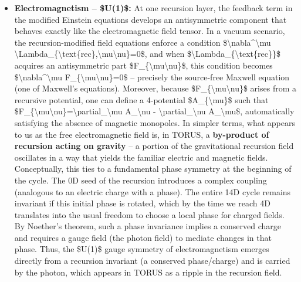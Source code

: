 \documentclass[
]{article}
\begin{document}
\begin{itemize}
\item
  \textbf{Electromagnetism -- \$U(1)\$:} At one recursion layer, the
  feedback term in the modified Einstein equations develops an
  antisymmetric component that behaves exactly like the electromagnetic
  field tensor. In a vacuum scenario, the recursion-modified field
  equations enforce a condition
  \$\textbackslash nabla\^{}\textbackslash mu
  \textbackslash Lambda\_\{\textbackslash text\{rec\},\textbackslash mu\textbackslash nu\}=0\$,
  and when \$\textbackslash Lambda\_\{\textbackslash text\{rec\}\}\$
  acquires an antisymmetric part
  \$F\_\{\textbackslash mu\textbackslash nu\}\$, this condition becomes
  \$\textbackslash nabla\^{}\textbackslash mu
  F\_\{\textbackslash mu\textbackslash nu\}=0\$ -- precisely the
  source-free Maxwell equation (one of Maxwell's equations)\hspace{0pt}.
  Moreover, because \$F\_\{\textbackslash mu\textbackslash nu\}\$ arises
  from a recursive potential, one can define a 4-potential
  \$A\_\{\textbackslash mu\}\$ such that
  \$F\_\{\textbackslash mu\textbackslash nu\}=\textbackslash partial\_\textbackslash mu
  A\_\textbackslash nu - \textbackslash partial\_\textbackslash nu
  A\_\textbackslash mu\$, automatically satisfying the absence of
  magnetic monopoles\hspace{0pt}. In simpler terms, what appears to us
  as the free electromagnetic field is, in TORUS, a \textbf{by-product
  of recursion acting on gravity} -- a portion of the gravitational
  recursion field oscillates in a way that yields the familiar electric
  and magnetic fields\hspace{0pt}. Conceptually, this ties to a
  fundamental phase symmetry at the beginning of the cycle. The 0D seed
  of the recursion introduces a complex coupling (analogous to an
  electric charge with a phase). The entire 14D cycle remains invariant
  if this initial phase is rotated, which by the time we reach 4D
  translates into the usual freedom to choose a local phase for charged
  fields\hspace{0pt}. By Noether's theorem, such a phase invariance
  implies a conserved charge and requires a gauge field (the photon
  field) to mediate changes in that phase\hspace{0pt}. Thus, the
  \$U(1)\$ gauge symmetry of electromagnetism emerges directly from a
  recursion invariant (a conserved phase/charge) and is carried by the
  photon, which appears in TORUS as a ripple in the recursion field.

\end{itemize}
\end{document}
